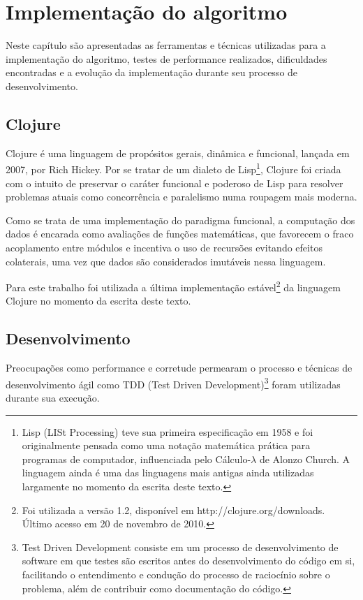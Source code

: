\chapter{Implementação do algoritmo}
\label{chap:implementacao}
Neste capítulo são apresentadas as ferramentas e técnicas utilizadas para a implementação do algoritmo, testes de performance realizados, dificuldades encontradas e a evolução da implementação durante seu processo de desenvolvimento.

\section{Clojure}
Clojure é uma linguagem de propósitos gerais, dinâmica e funcional, lançada em 2007, por Rich Hickey.
Por se tratar de um dialeto de Lisp\footnote{Lisp (LISt Processing) teve sua primeira especificação em 1958 e foi originalmente pensada como uma notação matemática prática para programas de computador, influenciada pelo Cálculo-$\lambda$ de Alonzo Church. A linguagem ainda é uma das linguagens mais antigas ainda utilizadas largamente no momento da escrita deste texto.}, Clojure foi criada com o intuito de preservar o caráter funcional e poderoso de Lisp para resolver problemas atuais como concorrência e paralelismo numa roupagem mais moderna.

Como se trata de uma implementação do paradigma funcional, a computação dos dados é encarada como avaliações de funções matemáticas, que favorecem o fraco acoplamento entre módulos e incentiva o uso de recursões evitando efeitos colaterais, uma vez que dados são considerados imutáveis nessa linguagem.

Para este trabalho foi utilizada a última implementação estável\footnote{Foi utilizada a versão 1.2, disponível em http://clojure.org/downloads. Último acesso em 20 de novembro de 2010.} da linguagem Clojure no momento da escrita deste texto.


\section{Desenvolvimento}
Preocupações como performance e corretude permearam o processo e técnicas de desenvolvimento ágil como TDD (Test Driven Development)\footnote{Test Driven Development consiste em um processo de desenvolvimento de software em que testes são escritos antes do desenvolvimento do código em si, facilitando o entendimento e condução do processo de raciocínio sobre o problema, além de contribuir como documentação do código.} foram utilizadas durante sua execução.

